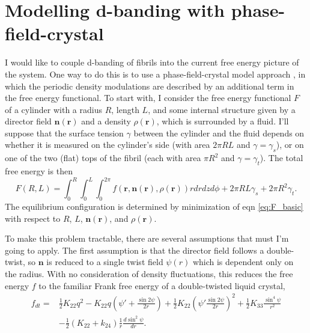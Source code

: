 \documentclass[12pt]{article}
\begin{document}


\section{Modelling d-banding with phase-field-crystal}
I would like to couple d-banding of fibrils into the current free energy picture of the system. One way to do this is to use a phase-field-crystal model approach \cite{Elder:2004ct}, in which the periodic density modulations are described by an additional term in the free energy functional. To start with, I consider the free energy functional $F$ of a cylinder with a radius $R$, length $L$, and some internal structure given by a director field $\bm{n}(\bm{r})$ and a density $\rho(\bm{r})$, which is surrounded by a fluid. I'll suppose that the surface tension $\gamma$ between the cylinder and the fluid depends on whether it is measured on the cylinder's side (with area $2\pi R L$ and $\gamma=\gamma_s$), or on one of the two (flat) tops of the fibril (each with area $\pi R^2$ and $\gamma=\gamma_t$). The total free energy is then
\begin{equation}\label{eq:F_basic}
F(R,L)=\int_0^R\int_0^L\int_0^{2\pi}f(\bm{r},\bm{n}(\bm{r}),\rho(\bm{r}))rdrdzd\phi+2\pi RL\gamma_s+2\pi R^2\gamma_t.
\end{equation}
The equilibrium configuration is determined by minimization of eqn \ref{eq:F_basic} with respect to $R$, $L$, $\bm{n}(\bm{r})$, and $\rho(\bm{r})$.

To make this problem tractable, there are several assumptions that must I'm going to apply. The first assumption is that the director field follows a double-twist, so $\bm{n}$ is reduced to a single twist field $\psi(r)$ which is dependent only on the radius. With no consideration of density fluctuations, this reduces the free energy $f$ to the familiar Frank free energy of a double-twisted liquid crystal,
\begin{align}\label{eq:frank}
f_{dt}=&\frac{1}{2}K_{22}q^2-K_{22}q\left(\psi'+\frac{\sin2\psi}{2r}\right)+\frac{1}{2}K_{22}\left(\psi'\frac{\sin2\psi}{2r}\right)^2+\frac{1}{2}K_{33}\frac{\sin^4\psi}{r^2}\nonumber\\
&-\frac{1}{2}\left(K_{22}+k_{24}\right)\frac{1}{r}\frac{d\sin^2\psi}{dr}.
\end{align}
\end{document}
